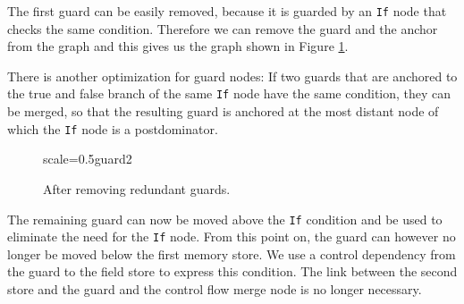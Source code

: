 \documentclass[twocolumn]{svjour3}
\begin{document}
The first guard can be easily removed, because it is guarded by an \texttt{If} node that checks the same condition.
Therefore we can remove the guard and the anchor from the graph and this gives us the graph shown in Figure \ref{fig:guard2}.

There is another optimization for guard nodes: If two guards that are anchored to the true and false branch of the same \texttt{If} node have the same condition, they can be merged, so that the resulting guard is anchored at the most distant node of which the \texttt{If} node is a postdominator.


\begin{figure}[ht]
  \centering
\begin{digraphenv}{scale=0.5}{guard2}
\end{digraphenv}
  \caption{After removing redundant guards.}
  \label{fig:guard2}
\end{figure}

The remaining guard can now be moved above the \texttt{If} condition and be used to eliminate the need for the \texttt{If} node.
From this point on, the guard can however no longer be moved below the first memory store.
We use a control dependency from the guard to the field store to express this condition.
The link between the second store and the guard and the control flow merge node is no longer necessary.
\end{document}
